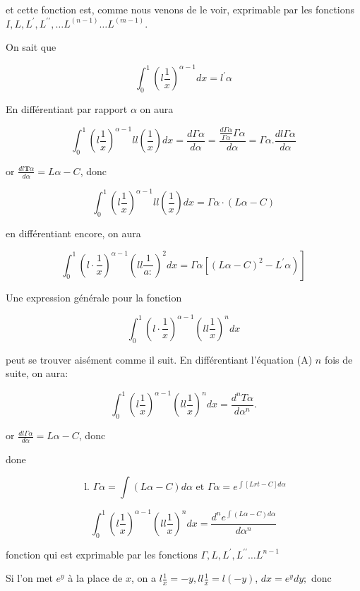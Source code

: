 \documentclass{article}
\begin{document}
et cette fonction est, comme nous venons de le voir, exprimable par les fonctions \(I, L, L^{\prime}, L^{\prime \prime}, \ldots L^{(n-1)} \ldots L^{(m-1)}\).

On sait que

\[
\int_{0}^{1}\left(l \frac{1}{x}\right)^{\alpha-1} d x=l^{\prime} \alpha
\]

En différentiant par rapport \( \alpha\) on aura

\[
\int_{0}^{1}\left(l \frac{1}{x}\right)^{\alpha-1} l l\left(\frac{1}{x}\right) d x=\frac{d \Gamma \alpha}{d \alpha}=\frac{\frac{d \Gamma \alpha}{\Gamma \alpha} \Gamma \alpha}{d \alpha}=\Gamma \alpha . \frac{d l \Gamma \alpha}{d \alpha}
\]

or \(\frac{d l \boldsymbol{T} \alpha}{d \alpha}=L \alpha-C\), donc

\[
\int_{0}^{1}\left(l \frac{1}{x}\right)^{\alpha-1} l l\left(\frac{1}{x}\right) d x=\Gamma \alpha \cdot(L \alpha-C)
\]

en différentiant encore, on aura

\[
\left.\int_{0}^{1}\left(l \cdot \frac{1}{x}\right)^{\alpha-1}\left(l l \frac{1}{a:}\right)^{2} d x=\Gamma \alpha\left[(L \alpha-C)^{2}-L^{\prime} \alpha\right)\right]
\]

Une expression générale pour la fonction

\[
\int_{0}^{1}\left(l \cdot \frac{1}{x}\right)^{\alpha-1}\left(l l \frac{1}{x}\right)^{n} d x
\]

peut se trouver aisément comme il suit. En différentiant l'équation (A) \(n\) fois de suite, on aura:

\[
\int_{0}^{1}\left(l \frac{1}{x}\right)^{\alpha-1}\left(l l \frac{1}{x}\right)^{n} d x=\frac{d^{n} T \alpha}{d \alpha^{n}} .
\]

or \(\frac{d l \Gamma \alpha}{d \alpha}=L \alpha-C\), donc

done

\[
\text { l. } \Gamma \alpha=\int(L \alpha-C) d \alpha \text { et } \Gamma \alpha=e^{\int[L r t-C] d \alpha}
\]

\[
\int_{0}^{1}\left(l \frac{1}{x}\right)^{\alpha-1}\left(l l \frac{1}{x}\right)^{n} d x=\frac{d^{n} e^{\int(L \alpha-C) d \alpha}}{d \alpha^{n}}
\]

fonction qui est exprimable par les fonctions \(\Gamma, L, L^{\prime}, L^{\prime \prime} \ldots L^{n-1}\)

Si l'on met \(e^{y}\) à la place de \(x\), on a \(l \frac{1}{x}=-y, l l \frac{1}{x}=l(-y)\), \(d x=e^{y} d y ;\) donc
\end{document}
